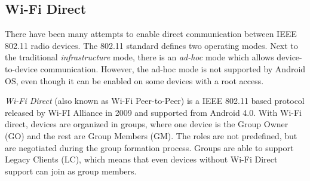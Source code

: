 
\subsection{Wi-Fi Direct}

There have been many attempts to enable direct communication between IEEE 802.11 radio devices. The 802.11 standard defines two operating modes. Next to the traditional \textit{infrastructure} mode, there is an \textit{ad-hoc} mode which allows device-to-device communication. However, the ad-hoc mode is not supported by Android OS, even though it can be enabled on some devices with a root access.

\textit{Wi-Fi Direct} (also known as Wi-Fi Peer-to-Peer) \cite{wifip2p} is a IEEE 802.11 based protocol released by Wi-FI Alliance in 2009 and supported from Android 4.0. With Wi-Fi direct, devices are organized in groups, where one device is the Group Owner (GO) and the rest are Group Members (GM). The roles are not predefined, but are negotiated during the group formation process. Groups are able to support Legacy Clients (LC), which means that even devices without Wi-Fi Direct support can join as group members.



